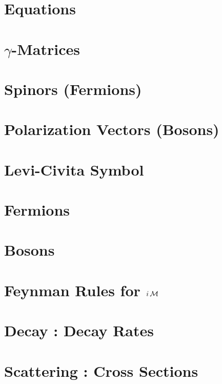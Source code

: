 \documentclass[landscape,8pt,a4paper,english]{extarticle}
\begin{document}
\begin{multicols}{3}\centering
        \section*{Equations}
        \section*{$\gamma$-Matrices}
        \section*{Spinors (Fermions)}
        \section*{Polarization Vectors (Bosons)}
        \section*{Levi-Civita Symbol}
        \section*{Fermions}
        \section*{Bosons}
        \section*{Feynman Rules for $i\operatorname{\mathcal{M}}$}
        \section*{Decay : Decay Rates}
        \section*{Scattering : Cross Sections}
\end{multicols}
\end{document}

